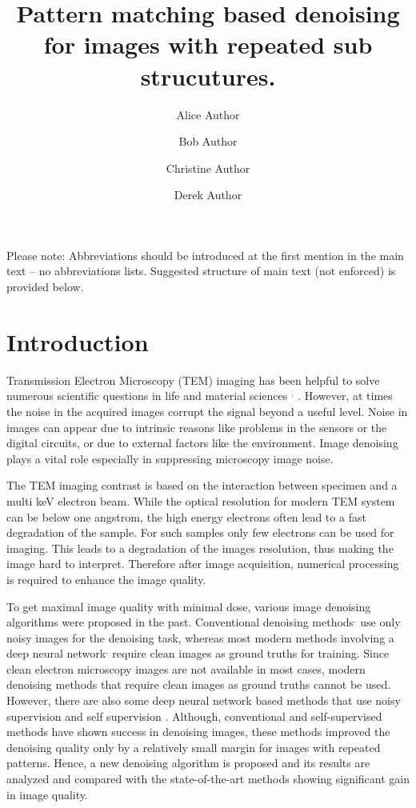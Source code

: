 \documentclass[fleqn,10pt]{wlscirep}
\title{Pattern matching based denoising for images with repeated sub strucutures.}
\author[1,*]{Alice Author}
\author[2]{Bob Author}
\author[1,2,+]{Christine Author}
\author[2,+]{Derek Author}
\affil[1]{Affiliation, department, city, postcode, country}
\affil[2]{Affiliation, department, city, postcode, country}
\affil[*]{corresponding.author@email.example}
\affil[+]{these authors contributed equally to this work}
\begin{document}
\flushbottom
\maketitle
%
%
\thispagestyle{empty}

\noindent Please note: Abbreviations should be introduced at the first mention in the main text – no abbreviations lists. Suggested structure of main text (not enforced) is provided below.

\section*{Introduction}

Transmission Electron Microscopy (TEM) imaging has been helpful to solve numerous scientific questions in life and material sciences \cite{CURRY200691}$^{,}$\cite{WANG2008395} . However, at times the noise in the acquired images corrupt the signal beyond a useful level. Noise in images can appear due to intrinsic reasons like problems in the sensors or the digital circuits, or due to external factors like the environment. Image denoising plays a vital role especially in suppressing microscopy image noise.

The TEM imaging contrast is based on the interaction between specimen and a multi keV electron beam. While the optical resolution for modern TEM system can be below one angstrom, the high energy electrons often lead to a fast degradation of the sample. For such samples only few electrons can be used for imaging. This leads to a degradation of the images resolution, thus making the image hard to interpret. Therefore after image acquisition, numerical processing is required to enhance the image quality.

To get maximal image quality with minimal dose, various image denoising algorithms were proposed in the past. Conventional denoising methods\cite{bcm_nlm}$^{,}$ \cite{DBLP:journals/tip/BM3D} use only noisy images for the denoising task, whereas most modern methods involving a deep neural network\cite{zhang2018ffdnet}$^{,}$ \cite{zhang2017beyond} require clean images as ground truths for training. Since clean electron microscopy images are not available in most cases, modern denoising methods that require clean images as ground truths cannot be used. However, there are also some deep neural network based methods that use noisy supervision\cite{DBLP:journals/corr/abs-1803-04189} and self supervision\cite{krull2019noise2void} . Although, conventional and self-supervised methods have shown success in denoising images, these methods improved the denoising quality only by a relatively small margin for images with repeated patterns. Hence, a new denoising algorithm is proposed and its results are analyzed and compared with the state-of-the-art methods showing significant gain in image quality. 
\end{document}
